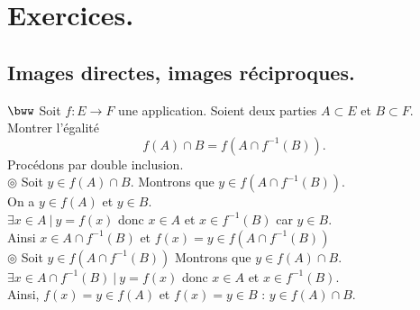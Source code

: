 \documentclass[11pt]{article}
\begin{document}
\section{Exercices.}

\subsection*{Images directes, images réciproques.}

\begin{exercice}{$\bww$}{}
    Soit $f:E\to F$ une application. Soient deux parties $A \subset E$ et $B \subset F$. Montrer l'égalité
    \begin{equation*}
        f(A) \cap B = f(A \cap f^{-1}(B)).
    \end{equation*}
    \tcblower
    Procédons par double inclusion.\\
    $\circledcirc$ Soit $y\in f(A) \cap B$. Montrons que $y\in f(A \cap f^{-1}(B))$.\\
    On a $y\in f(A)$ et $y\in B$.\\
    $\exists x\in A ~ | ~ y = f(x)$ donc $x\in A$ et $x\in f^{-1}(B)$ car $y\in B$.\\
    Ainsi $x\in A\cap f^{-1}(B)$ et $f(x) = y \in f(A \cap f^{-1}(B))$\\[0.15cm]
    $\circledcirc$ Soit $y\in f(A \cap f^{-1}(B))$ Montrons que $y\in f(A) \cap B$.\\
    $\exists x \in A \cap f^{-1}(B) ~ | ~ y = f(x)$ donc $x\in A$ et $x \in f^{-1}(B)$.\\
    Ainsi, $f(x) = y \in f(A)$ et $f(x) = y \in B$ : $y\in f(A)\cap B$.
\end{exercice}
\end{document}
